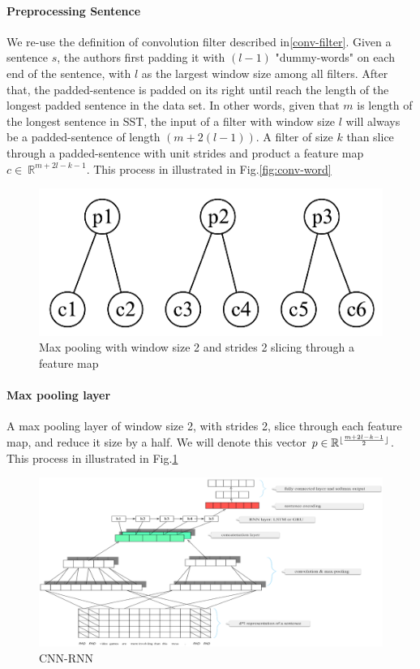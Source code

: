 \paragraph{Preprocessing Sentence} We re-use the definition of convolution filter described in\ref{conv-filter}.
Given a sentence \(s\), the authors first padding it with \((l-1)\) "dummy-words" on each end of the sentence, with \(l\) as the largest window size among all filters.
After that, the padded-sentence is padded on its right until reach the length of the longest padded sentence in the data set.
In other words, given that \(m\) is length of the longest sentence in SST, the input of a filter with window size \(l\) will always be a padded-sentence of length \((m + 2(l-1))\).
A filter of size \(k\) than slice through a padded-sentence with unit strides and product a feature map \(c \in \ \mathbb{R}^{m + 2l - k - 1}\).
This process in illustrated in Fig.\ref{fig:conv-word}

\begin{figure}[H]
	\centering	\includegraphics[scale=0.4]{figure/2-max}
	\caption{Max pooling with window size 2 and strides 2 slicing through a feature map}
	\label{fig:2-max-pooling}
\end{figure}
  
\paragraph{Max pooling layer} A max pooling layer of window size 2, with strides 2, slice through each feature map, and reduce it size by a half.
We will denote this vector \(p \in \mathbb{R}^{\lfloor \frac{m + 2l - k - 1}{2} \rfloor} \). 
This process in illustrated in Fig.\ref{fig:2-max-pooling}   


\begin{figure}[H]
	\raggedleft	\includegraphics[scale=0.34]{figure/cnn-rnn}
	\caption{CNN-RNN}
	\label{fig:cnn-rnn}
\end{figure}

